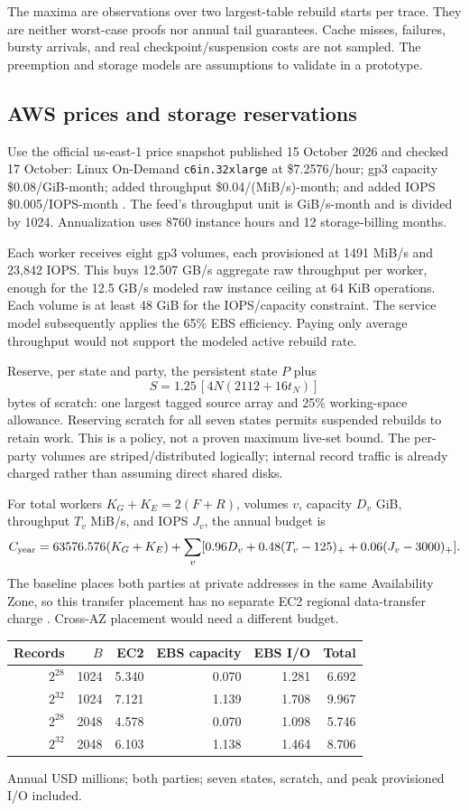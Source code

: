 \documentclass[11pt]{article}
\begin{document}
The maxima are observations over two largest-table rebuild starts per
trace. They are neither worst-case proofs nor annual tail guarantees.
Cache misses, failures, bursty arrivals, and real checkpoint/suspension
costs are not sampled. The preemption and storage models are assumptions
to validate in a prototype.

\subsection{AWS prices and storage reservations}
Use the official us-east-1 price snapshot published 15 October 2026 and
checked 17 October: Linux On-Demand \texttt{c6in.32xlarge} at \$7.2576/hour;
gp3 capacity \$0.08/GiB-month; added throughput \$0.04/(MiB/s)-month; and
added IOPS \$0.005/IOPS-month \cite{aws-prices,aws-gp3}. The feed's
throughput unit is GiB/s-month and is divided by 1024. Annualization uses
8760 instance hours and 12 storage-billing months.

Each worker receives eight gp3 volumes, each provisioned at 1491 MiB/s
and 23,842 IOPS. This buys 12.507 GB/s aggregate raw throughput per worker,
enough for the 12.5 GB/s modeled raw instance ceiling at 64 KiB operations.
Each volume is at least 48 GiB for the IOPS/capacity constraint. The service
model subsequently applies the 65\% EBS efficiency. Paying only average
throughput would not support the modeled active rebuild rate.

Reserve, per state and party, the persistent state $P$ plus
\[
 S=1.25\,[4N(2112+16t_N)]
\]
bytes of scratch: one largest tagged source array and 25\% working-space
allowance. Reserving scratch for all seven states permits suspended
rebuilds to retain work. This is a policy, not a proven maximum live-set
bound. The per-party volumes are striped/distributed logically; internal
record traffic is already charged rather than assuming direct shared disks.

For total workers $K_G+K_E=2(F+R)$, volumes $v$, capacity $D_v$ GiB,
throughput $T_v$ MiB/s, and IOPS $J_v$, the annual budget is
\[
 C_{\rm year}=63576.576(K_G+K_E)+
 \sum_v[0.96D_v+0.48(T_v-125)_++0.06(J_v-3000)_+].
\]
The baseline places both parties at private addresses in the same Availability Zone, so this
transfer placement has no separate EC2 regional data-transfer charge
\cite{aws-transfer}. Cross-AZ placement would need a different budget.

\begin{center}\small
\begin{tabular}{rrrrrr}\toprule
Records & $B$ & EC2 & EBS capacity & EBS I/O & Total\\\midrule
$2^{28}$ & 1024 & 5.340 & 0.070 & 1.281 & 6.692\\
$2^{32}$ & 1024 & 7.121 & 1.139 & 1.708 & 9.967\\
$2^{28}$ & 2048 & 4.578 & 0.070 & 1.098 & 5.746\\
$2^{32}$ & 2048 & 6.103 & 1.138 & 1.464 & 8.706\\
\bottomrule\end{tabular}\end{center}
{\footnotesize Annual USD millions; both parties; seven states, scratch, and peak provisioned I/O included.\par}
\end{document}

